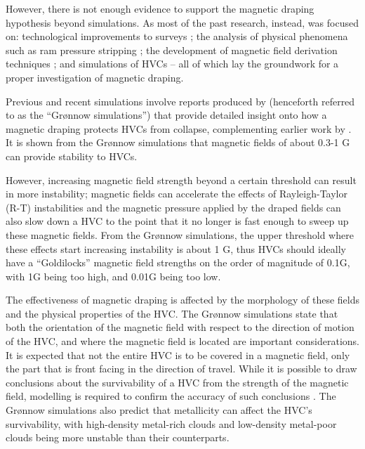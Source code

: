 However, there is not enough evidence to support the magnetic draping hypothesis beyond simulations. As most of the past research, instead, was focused on: technological improvements to surveys \citep{ID52, ID1, ID3, ID6, ID18, ID43, ID44, ID45}; the analysis of physical phenomena such as ram pressure stripping \citep{ID11, ID23, ID33}; the development of magnetic field derivation techniques \citep{ID5, ID23, ID30, ID11, ID26, ID21}; and simulations of HVCs \citep{ID13, ID23, ID24, ID33, ID34} – all of which lay the groundwork for a proper investigation of magnetic draping.


Previous and recent simulations involve reports produced by \cite{ID23, ID24, ID33} (henceforth referred to as the “Grønnow simulations”) that provide detailed insight onto how a magnetic draping protects HVCs from collapse, complementing earlier work by \cite{ID13, ID11}. It is shown from the Grønnow simulations that magnetic fields of about 0.3-1 {\textmu}G can provide stability to HVCs.


However, increasing magnetic field strength beyond a certain threshold can result in more instability; magnetic fields can accelerate the effects of Rayleigh-Taylor (R-T) instabilities and the magnetic pressure applied by the draped fields can also slow down a HVC to the point that it no longer is fast enough to sweep up these magnetic fields. From the Grønnow simulations, the upper threshold where these effects start increasing instability is about 1 {\textmu}G, thus HVCs should ideally have a “Goldilocks” magnetic field strengths on the order of magnitude of 0.1{\textmu}G, with 1{\textmu}G being too high, and 0.01{\textmu}G being too low.


The effectiveness of magnetic draping is affected by the morphology of these fields and the physical properties of the HVC. The Grønnow simulations state that both the orientation of the magnetic field with respect to the direction of motion of the HVC, and where the magnetic field is located are important considerations. It is expected that not the entire HVC is to be covered in a magnetic field, only the part that is front facing in the direction of travel. While it is possible to draw conclusions about the survivability of a HVC from the strength of the magnetic field, modelling is required to confirm the accuracy of such conclusions \citep{ID5}. The Grønnow simulations also predict that metallicity can affect the HVC's survivability, with high-density metal-rich clouds and low-density metal-poor clouds being more unstable than their counterparts.


